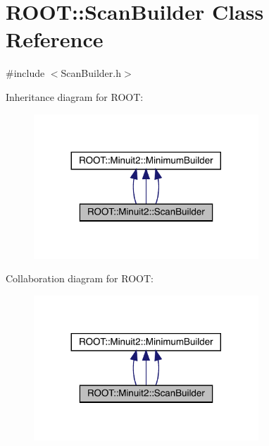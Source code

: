 \hypertarget{classROOT_1_1Minuit2_1_1ScanBuilder}{}\section{R\+O\+OT\+:\+:Scan\+Builder Class Reference}
\label{classROOT_1_1Minuit2_1_1ScanBuilder}


{\ttfamily \#include $<$Scan\+Builder.\+h$>$}



Inheritance diagram for R\+O\+OT\+:
\nopagebreak
\begin{figure}[H]
\begin{center}
\leavevmode
\includegraphics[width=239pt]{d2/d5e/classROOT_1_1Minuit2_1_1ScanBuilder__inherit__graph}
\end{center}
\end{figure}


Collaboration diagram for R\+O\+OT\+:
\nopagebreak
\begin{figure}[H]
\begin{center}
\leavevmode
\includegraphics[width=239pt]{da/df9/classROOT_1_1Minuit2_1_1ScanBuilder__coll__graph}
\end{center}
\end{figure}
